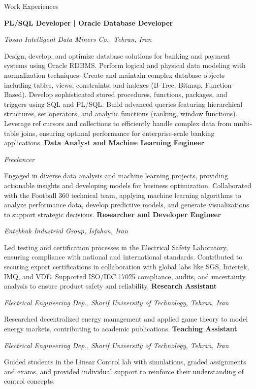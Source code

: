 \begin{rubric}{Work Experiences}

%
	\textbf{PL/SQL Developer | Oracle Database Developer} 
    \par \emph{Tosan Intelligent Data Miners Co., Tehran, Iran}
    \par Design, develop, and optimize database solutions for banking and payment systems using Oracle RDBMS. Perform logical and physical data modeling with normalization techniques. Create and maintain complex database objects including tables, views, constraints, and indexes (B-Tree, Bitmap, Function-Based). Develop sophisticated stored procedures, functions, packages, and triggers using SQL and PL/SQL. Build advanced queries featuring hierarchical structures, set operators, and analytic functions (ranking, window functions). Leverage ref cursors and collections to efficiently handle complex data from multi-table joins, ensuring optimal performance for enterprise-scale banking applications.
%
%
	\textbf{Data Analyst and Machine Learning Engineer} 
    \par \emph{Freelancer}
    \par Engaged in diverse data analysis and machine learning projects, providing actionable insights and developing models for business optimization. Collaborated with the Football 360 technical team, applying machine learning algorithms to analyze performance data, develop predictive models, and generate visualizations to support strategic decisions.
%
%
	\textbf{Researcher and Developer Engineer } 
    \par \emph{Entekhab Industrial Group, Isfahan, Iran}
    \par Led testing and certification processes in the Electrical Safety Laboratory, ensuring compliance with national and international standards. Contributed to securing export certifications in collaboration with global labs like SGS, Intertek, IMQ, and VDE. Supported ISO/IEC 17025 compliance, audits, and uncertainty analysis to ensure product safety and reliability.
%
%
	\textbf{Research Assistant} 
    \par \emph{Electrical Engineering Dep., Sharif University of Technology, Tehran, Iran}
    \par Researched decentralized energy management and applied game theory to model energy markets, contributing to academic publications.
%
%
	\textbf{Teaching Assistant}
    \par \emph{Electrical Engineering Dep., Sharif University of Technology, Tehran, Iran}
    \par Guided students in the Linear Control lab with simulations, graded assignments and exams, and provided individual support to reinforce their understanding of control concepts.
\end{rubric}